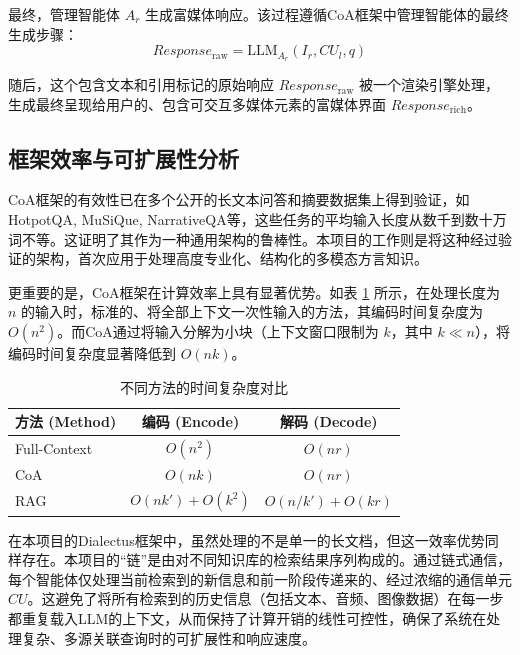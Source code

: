 最终，管理智能体 $A_r$ 生成富媒体响应。该过程遵循CoA框架中管理智能体的最终生成步骤：
\begin{equation}
    Response_{\text{raw}} = \text{LLM}_{A_r} (I_r, CU_l, q)
    \label{eq:response_raw}
\end{equation}

随后，这个包含文本和引用标记的原始响应 $Response_{\text{raw}}$ 被一个渲染引擎处理，生成最终呈现给用户的、包含可交互多媒体元素的富媒体界面 $Response_{\text{rich}}$。

\subsection{框架效率与可扩展性分析}
CoA框架的有效性已在多个公开的长文本问答和摘要数据集上得到验证，如HotpotQA, MuSiQue, NarrativeQA等，这些任务的平均输入长度从数千到数十万词不等。这证明了其作为一种通用架构的鲁棒性。本项目的工作则是将这种经过验证的架构，首次应用于处理高度专业化、结构化的多模态方言知识。

更重要的是，CoA框架在计算效率上具有显著优势。如表 \ref{tab:time_complexity} 所示，在处理长度为 $n$ 的输入时，标准的、将全部上下文一次性输入的方法，其编码时间复杂度为 $O(n^2)$。而CoA通过将输入分解为小块（上下文窗口限制为 $k$，其中 $k \ll n$），将编码时间复杂度显著降低到 $O(nk)$。

\begin{table}[H]
    \centering
    \caption{不同方法的时间复杂度对比}
    \label{tab:time_complexity}
    \begin{tabular}{@{}lcc@{}}
        \toprule
        \textbf{方法 (Method)} & \textbf{编码 (Encode)} & \textbf{解码 (Decode)} \\
        \midrule
        Full-Context        & $O(n^2)$              & $O(nr)$               \\
        CoA                 & $O(nk)$               & $O(nr)$               \\
        RAG                 & $O(nk') + O(k^2)$      & $O(n/k') + O(kr)$     \\
        \bottomrule
    \end{tabular}
\end{table}

在本项目的Dialectus框架中，虽然处理的不是单一的长文档，但这一效率优势同样存在。本项目的“链”是由对不同知识库的检索结果序列构成的。通过链式通信，每个智能体仅处理当前检索到的新信息和前一阶段传递来的、经过浓缩的通信单元 $CU$。这避免了将所有检索到的历史信息（包括文本、音频、图像数据）在每一步都重复载入LLM的上下文，从而保持了计算开销的线性可控性，确保了系统在处理复杂、多源关联查询时的可扩展性和响应速度。
